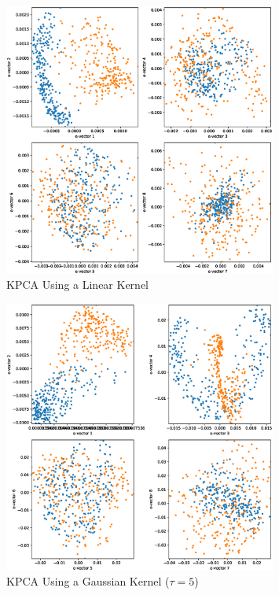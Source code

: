 \documentclass{article}[12pt]
\begin{document}
\begin{enumerate}
\begin{figure}
	\centering 
\includegraphics[width=0.8\textwidth]{./img/kpca_linear.eps}
\caption{\label{fig:kpca_lin}KPCA Using a Linear Kernel}
\end{figure}

\begin{figure}
	\centering 
\includegraphics[width=0.8\textwidth]{./img/kpca_gaussian_5.eps}
\caption{\label{fig:kpca_gauss}KPCA Using a Gaussian Kernel ($\tau = 5$)}
\end{figure}



\end{enumerate}
\end{document}
